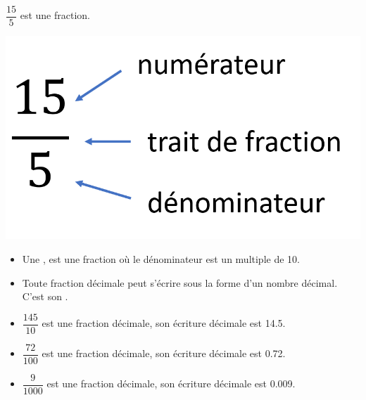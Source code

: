 \begin{myex}
	$\dfrac{15}{5}$ est une fraction.
	
	\begin{center}
		\includegraphics[scale=0.4]{img/frac2}
	\end{center}
\end{myex}

\begin{mydef}
	\begin{itemize}
		\item Une , est une fraction où le dénominateur est un multiple de 10.		
		
		\item Toute fraction décimale peut s'écrire sous la forme d'un nombre décimal. C'est son .
	\end{itemize}	
	
\end{mydef}


\begin{myexs}
	\begin{itemize}
		\item $\dfrac{145}{10}$ est une fraction décimale, son écriture décimale est \num{14.5}.
		\item $\dfrac{72}{100}$ est une fraction décimale, son écriture décimale est \num{0.72}.
		\item $\dfrac{9}{1000}$ est une fraction décimale, son écriture décimale est \num{0.009}.
	\end{itemize}
\end{myexs}


